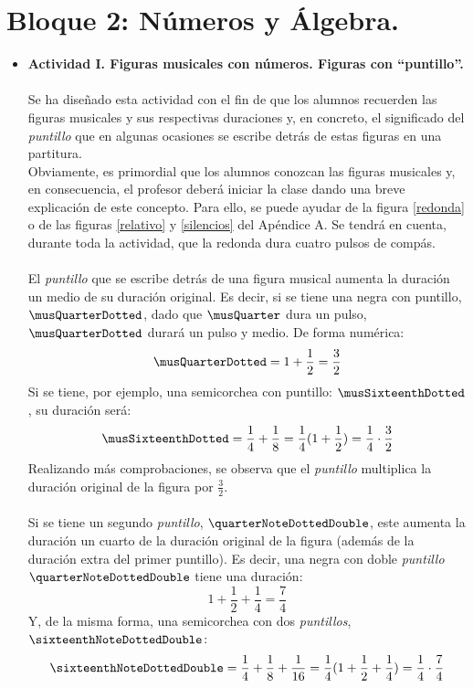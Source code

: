 \documentclass[a4paper, openright, 11pt, titlepage]{report}
\theoremstyle{definition}\newtheorem{defin}[propo]{Definition}
\theoremstyle{definition}\newtheorem{obser}[propo]{Remark}
\theoremstyle{definition}\newtheorem{ejem}[propo]{Ejemplo}
\theoremstyle{definition}\newtheorem{algoritmo}[propo]{Algoritmo}
\begin{document}
\section{Bloque 2: Números y Álgebra.}
\begin{itemize}
    \item \textbf{Actividad I. Figuras musicales con números. Figuras con ``puntillo''.}\\\\
    Se ha diseñado esta actividad con el fin de que los alumnos recuerden las figuras musicales y sus respectivas duraciones y, en concreto, el significado del \textit{puntillo} que en algunas ocasiones se escribe detrás de estas figuras en una partitura.\\
   Obviamente, es primordial que los alumnos conozcan las figuras musicales y, en consecuencia, el profesor deberá iniciar la clase dando una breve explicación de este concepto. Para ello, se puede ayudar de la figura \ref{redonda} o de las figuras \ref{relativo} y \ref{silencios} del Apéndice A. Se tendrá en cuenta, durante toda la actividad, que la redonda dura cuatro pulsos de compás.\\\\
    El \textit{puntillo} que se escribe detrás de una figura musical aumenta la duración un medio de su duración original. Es decir, si se tiene una negra con puntillo, $\musQuarterDotted$, dado que $\musQuarter$ dura un pulso, $\musQuarterDotted$ durará un pulso y medio. De forma numérica: $$\musQuarterDotted = 1 + \frac{1}{2} = \frac{3}{2}$$
    Si se tiene, por ejemplo, una semicorchea con puntillo: $\musSixteenthDotted$, su duración será: $$\musSixteenthDotted = \frac{1}{4} + \frac{1}{8} = \frac{1}{4}(1 + \frac{1}{2}) = \frac{1}{4}\cdot\frac{3}{2}$$
    Realizando más comprobaciones, se observa que el \textit{puntillo} multiplica la duración original de la figura por $\frac{3}{2}$.\\\\
    Si se tiene un segundo \textit{puntillo}, $\quarterNoteDottedDouble$, este aumenta la duración un cuarto de la duración original de la figura (además de la duración extra del primer puntillo). Es decir, una negra con doble \textit{puntillo} $\quarterNoteDottedDouble$ tiene una duración:
    $$1 + \frac{1}{2} + \frac{1}{4} = \boxed{\frac{7}{4}}$$
    Y, de la misma forma, una semicorchea con dos \textit{puntillos}, $\sixteenthNoteDottedDouble$: $$\sixteenthNoteDottedDouble = \frac{1}{4} + \frac{1}{8} + \frac{1}{16} = \frac{1}{4}(1+\frac{1}{2} + \frac{1}{4}) = \frac{1}{4}\cdot\frac{7}{4}$$

\end{itemize}
\end{document}
